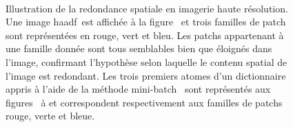 \begin{figure}
    \centering
    \\
    \hfill
    \hfill
    \caption{Illustration de la redondance spatiale en imagerie haute résolution. Une image \gls{haadf} est affichée à la figure~ et trois familles de patch sont représentées en rouge, vert et bleu. Les patchs appartenant à une famille donnée sont tous semblables bien que éloignés dans l'image, confirmant l'hypothèse selon laquelle le contenu spatial de l'image est redondant. Les trois premiers atomes d'un dictionnaire appris à l'aide de la méthode mini-batch~\cite{mairal2009online} sont représentés aux figures~ à  et correspondent respectivement aux familles de patchs rouge, verte et bleue.
        \protect\label{fig-redondance-spatiale}}
\end{figure}

